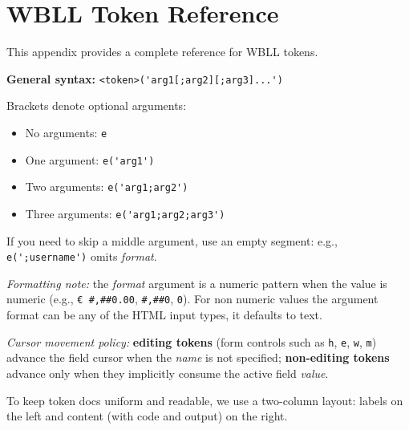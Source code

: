 
\chapter{WBLL Token Reference}
\label{app:wbll-tokens}

This appendix provides a complete reference for WBLL tokens.

\newcommand{\wballsyn}[1]{\lstinline[language=WBLL,basicstyle=\ttfamily\small]!#1!}

\noindent\textbf{General syntax:} \wballsyn{<token>('arg1[;arg2][;arg3]...')}

\noindent Brackets denote optional arguments:
\begin{itemize}
  \item No arguments: \wballsyn{e}
  \item One argument: \wballsyn{e('arg1')}
  \item Two arguments: \wballsyn{e('arg1;arg2')}
  \item Three arguments: \wballsyn{e('arg1;arg2;arg3')}
\end{itemize}
If you need to skip a middle argument, use an empty segment: e.g., \wballsyn{e(';username')} omits \textit{format}.

\par\smallskip
\textit{Formatting note:} the \textit{format} argument is a numeric pattern when the value is numeric (e.g., \texttt{€ \#,\#\#0.00}, \texttt{\#,\#\#0}, \texttt{0}). For non numeric values the argument format can be any of the HTML input types, it defaults to text.
\par\smallskip
\textit{Cursor movement policy:} \textbf{editing tokens} (form controls such as \texttt{h}, \texttt{e}, \texttt{w}, \texttt{m}) advance the field cursor when the \emph{name} is not specified; \textbf{non-editing tokens} advance only when they implicitly consume the active field \emph{value}.

To keep token docs uniform and readable, we use a two-column layout: labels on the left and content (with code and output) on the right.

